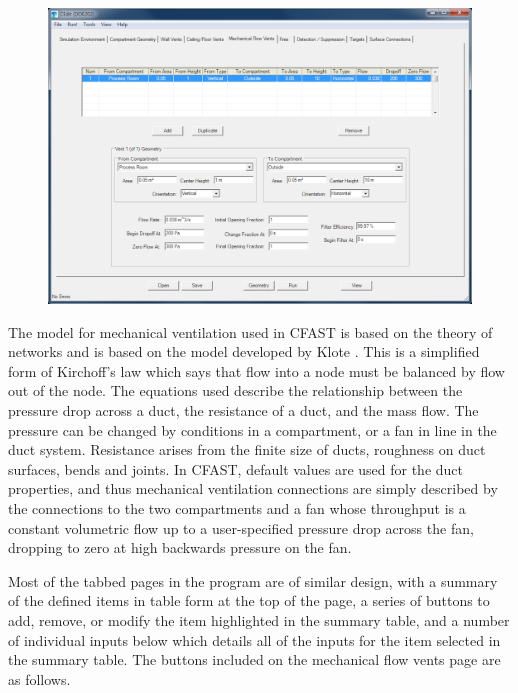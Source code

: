 \begin{figure}[h!]
\begin{center}
\includegraphics[width=6.5in]{FIGURES/Input_File/Mechanical_Vent_Tab}
\end{center}
\end{figure}

The model for mechanical ventilation used in CFAST is based on the theory of networks and is based on the model developed by Klote \cite{Klote:1988a}.  This is a simplified form of Kirchoff's law which says that flow into a node must be balanced by flow out of the node. The equations used describe the relationship between the pressure drop across a duct, the resistance of a duct, and the mass flow.  The pressure can be changed by conditions in a compartment, or a fan in line in the duct system.  Resistance arises from the finite size of ducts, roughness on duct surfaces, bends and joints. In CFAST, default values are used for the duct properties, and thus mechanical ventilation connections are simply described by the connections to the two compartments and a fan whose throughput is a constant volumetric flow up to a user-specified pressure drop across the fan, dropping to zero at high backwards pressure on the fan.

Most of the tabbed pages in the program are of similar design, with a summary of the defined items in table form at the top of the page, a series of buttons to add, remove, or modify the item highlighted in the summary table, and a number of individual inputs below which details all of the inputs for the item selected in the summary table. The buttons included on the mechanical flow vents page are as follows.

